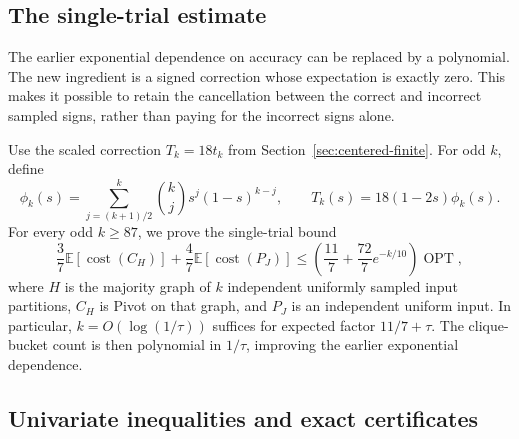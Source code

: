 \documentclass[11pt]{article}
\begin{document}
\subsection{The single-trial estimate}

The earlier exponential dependence on accuracy can be replaced by a polynomial. The new ingredient
is a signed correction whose expectation is exactly zero. This makes it
possible to retain the cancellation between the correct and incorrect
sampled signs, rather than paying for the incorrect signs alone.

Use the scaled correction $T_k=18t_k$ from Section~\ref{sec:centered-finite}.
For odd $k$, define
\[
 \phi_k(s)=\sum_{j=(k+1)/2}^k\binom{k}{j}s^j(1-s)^{k-j},
 \qquad T_k(s)=18(1-2s)\phi_k(s).
\]
For every odd $k\ge87$, we prove the single-trial bound
\begin{equation}
 \frac37\mathbb E[\operatorname{cost}(C_H)]
 +\frac47\mathbb E[\operatorname{cost}(P_J)]
 \le \left(\frac{11}{7}+\frac{72}{7}e^{-k/10}\right)
              \operatorname{OPT},
 \label{eq:centered-main}
\end{equation}
where $H$ is the majority graph of $k$ independent uniformly sampled
input partitions, $C_H$ is Pivot on that graph, and $P_J$ is an independent
uniform input. In particular, $k=O(\log(1/\tau))$ suffices for expected
factor $11/7+\tau$. The clique-bucket count is then polynomial in
$1/\tau$, improving the earlier exponential dependence.

\subsection{Univariate inequalities and exact certificates}
\end{document}

